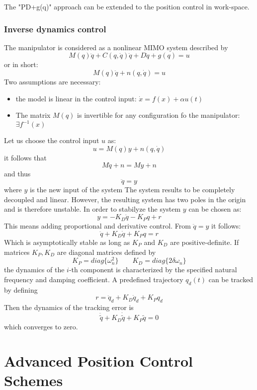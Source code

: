\documentclass{book}
\begin{document}
The "PD+g(q)" approach can be extended to the position control in work-space.





\subsection{Inverse dynamics control}
The manipulator is considered as a nonlinear MIMO system described by 
\[
    M(q)\ddot{q}+C(q,\dot{q})\dot{q}+D\dot{q}+g(q)=u
\]
or in short:
\[
    M(q)\ddot{q}+n(q,\dot{q})=u
\]
Two assumptions are necessary:
\begin{itemize}
    \item the model is linear in the control input: $ \dot{x}=f(x)+\alpha u(t)$
    \item The matrix $M(q)$ is invertible for any configuration fo the manipulator: $ \exists f^{-1}(x)$
\end{itemize}
Let us choose the control input $u$ as:
\[
    u=M(q)y + n(q,\dot{q})
\]
it follows that
\[
    M\ddot{q}+n=My+n
\]
and thus
\[
    \ddot{q}=y
\]
where $y$ is the new input of the system
The system results to be completely decoupled and linear. However, the resulting system has two poles in the origin and is therefore unstable. In order to stabilyze the system $y$ can be chosen as:
\[
    y= -K_D\dot{q}-K_Pq+r
\]
This means adding proportional and derivative control. From $\ddot{q}=y$ it follows:
\[
    \ddot{q}+K_D\dot{q}+K_Pq=r
\]
Which is asymptotically stable as long as $K_P$ and $K_D$ are positive-definite. If matrices $K_P,K_D$ are diagonal matrices defined by
\[
    K_P=diag\{\omega_n^2\} \qquad K_D=diag\{2\delta \omega_n\}
\]
the dynamics of the $i$-th component is characterized by the specified natural frequency and damping coefficient. A predefined trajectory $q_d(t)$ can be tracked by defining
\[
    r = \ddot{q}_d+K_D\dot{q}_d+K_Pq_d
\]
Then the dynamics of the tracking error is
\[
    \ddot{\tilde{q}} + K_D\dot{\tilde{q}} + K_P\tilde{q} = 0
\]
which converges to zero.









\chapter{Advanced Position Control Schemes}
\end{document}

